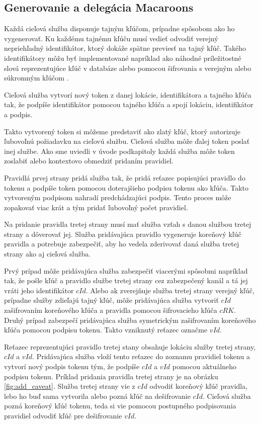 \subsection{Generovanie a delegácia Macaroons}

Každá cieľová služba disponuje tajným kľúčom, prípadne spôsobom ako ho vygenerovať. Ku každému tajnému kľúču musí vedieť odvodiť verejný nepriehľadný identifikátor, ktorý dokáže spätne previesť na tajný kľúč. Takého identifikátory môžu byť implementované napríklad ako náhodné príležitostné slová reprezentujúce kľúč v databáze alebo pomocou šifrovania s verejným alebo súkromným kľúčom \cite{macaroons_key_id}.

Cieľová služba vytvorí nový token z danej lokácie, identifikátora a tajného kľúča tak, že podpíše identifikátor pomocou tajného kľúča a spojí lokáciu, identifikátor a podpis.

Takto vytvorený token si môžeme predstaviť ako zlatý kľúč, ktorý autorizuje ľubovoľnú požiadavku na cieľovú službu. Cieľová služba môže ďalej token poslať inej službe. Ako sme uviedli v úvode podkapitoly každá služba môže token zoslabiť alebo kontextovo obmedziť pridaním pravidiel.

Pravidlá prvej strany pridá služba tak, že pridá reťazec popisujúci pravidlo do tokenu a podpíše token pomocou doterajšieho podpisu tokenu ako kľúča. Takto vytvoreným podpisom nahradí predchádzajúci podpis. Tento proces môže zopakovať viac krát a tým pridať ľubovoľný počet pravidiel.

Na pridanie pravidla tretej strany musí mať služba vzťah s danou službou tretej strany a dôverovať jej. Služba pridávajúca pravidlo vygeneruje koreňový kľúč pravidla a potrebuje zabezpečiť, aby ho vedela zderivovať daná služba tretej strany ako aj cieľová služba. 

Prvý prípad môže pridávajúca služba zabezpečiť viacerými spôsobmi napríklad tak, že pošle kľúč a pravidlo službe tretej strany cez zabezpečený kanál a tá jej vráti jeho identifikátor $cId$. Alebo ak zverejňuje služba tretej strany verejný kľúč, prípadne služby zdieľajú tajný kľúč, môže pridávajúca služba vytvoriť $cId$ zašifrovaním koreňového kľúča a pravidla pomocou šifrovacieho kľúča $cRK$. Druhý prípad zabezpečí pridávajúca služba symetrickým zašifrovaním koreňového kľúča pomocou podpisu tokenu. Takto vzniknutý reťazec označme $vId$.

Reťazec reprezentujúci pravidlo tretej stany obsahuje lokáciu služby tretej strany, $cId$ a $vId$. Pridávajúca služba vloží tento reťazec do zoznamu pravidiel tokenu a vytvorí nový podpis tokenu tým, že podpíše $cId$ a $vId$ pomocou aktuálneho podpisu tokenu. Príklad pridania pravidla tretej strany je na obrázku \ref{fig:add_caveat}. Služba tretej strany vie z $cId$ odvodiť koreňový kľúč pravidla, lebo ho buď sama vytvorila alebo pozná kľúč na dešifrovanie $cId$. Cieľová služba pozná koreňový kľúč tokenu, teda si vie pomocou postupného podpisovania pravidiel odvodiť kľúč pre dešifrovanie $vId$.

